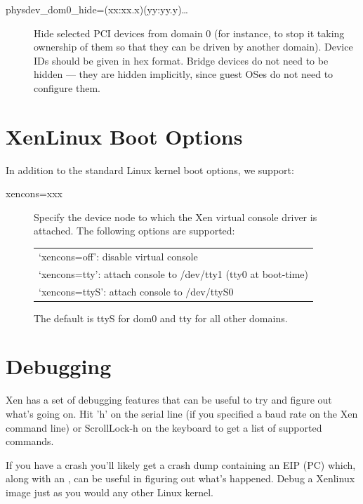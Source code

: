 \documentclass[11pt,twoside,final,openright]{report}
\begin{document}
{\begin{description}
\item [physdev\_dom0\_hide=(xx:xx.x)(yy:yy.y)\ldots ]
Hide selected PCI devices from domain 0 (for instance, to stop it
taking ownership of them so that they can be driven by another
domain).  Device IDs should be given in hex format.  Bridge devices do
not need to be hidden --- they are hidden implicitly, since guest OSes
do not need to configure them.
\end{description} 



\section{XenLinux Boot Options}

In addition to the standard Linux kernel boot options, we support: 
\begin{description} 
\item[xencons=xxx ] Specify the device node to which the Xen virtual
console driver is attached. The following options are supported:
\begin{center}
\begin{tabular}{l}
`xencons=off': disable virtual console \\ 
`xencons=tty': attach console to /dev/tty1 (tty0 at boot-time) \\
`xencons=ttyS': attach console to /dev/ttyS0
\end{tabular}
\end{center}
The default is ttyS for dom0 and tty for all other domains.
\end{description} 



\section{Debugging}
\label{s:keys} 

Xen has a set of debugging features that can be useful to try and
figure out what's going on. Hit 'h' on the serial line (if you
specified a baud rate on the Xen command line) or ScrollLock-h on the
keyboard to get a list of supported commands.

If you have a crash you'll likely get a crash dump containing an EIP
(PC) which, along with an , can be useful in
figuring out what's happened.  Debug a Xenlinux image just as you
would any other Linux kernel.





}
\end{document}
